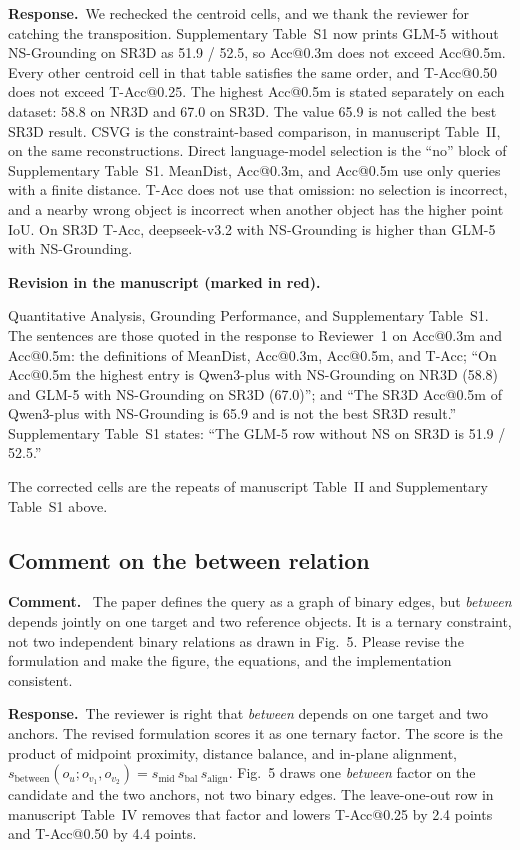 \documentclass[11pt]{article}
\newcommand{\revcomment}[1]{%
  \par\vspace{0.6em}\noindent\textcolor{revblue}{\textbf{Comment.}}\ %
  \textcolor{revblue}{#1}\par\vspace{0.4em}}
\newcommand{\revresponse}[1]{%
  \par\noindent\textbf{Response.}\ #1\par\vspace{0.3em}}
\newcommand{\revchange}[1]{%
  \par\noindent\textbf{Revision in the manuscript (marked in red).}\par
  \noindent\textcolor{revred}{#1}\par\vspace{0.8em}}
\begin{document}
\revresponse{We rechecked the centroid cells, and we thank the reviewer for catching the transposition. Supplementary Table~S1 now prints GLM-5 without NS-Grounding on SR3D as 51.9 / 52.5, so Acc@0.3m does not exceed Acc@0.5m. Every other centroid cell in that table satisfies the same order, and T-Acc@0.50 does not exceed T-Acc@0.25. The highest Acc@0.5m is stated separately on each dataset: 58.8 on NR3D and 67.0 on SR3D. The value 65.9 is not called the best SR3D result. CSVG is the constraint-based comparison, in manuscript Table~II, on the same reconstructions. Direct language-model selection is the ``no'' block of Supplementary Table~S1. MeanDist, Acc@0.3m, and Acc@0.5m use only queries with a finite distance. T-Acc does not use that omission: no selection is incorrect, and a nearby wrong object is incorrect when another object has the higher point IoU. On SR3D T-Acc, deepseek-v3.2 with NS-Grounding is higher than GLM-5 with NS-Grounding.}

\revchange{Quantitative Analysis, Grounding Performance, and Supplementary Table~S1. The sentences are those quoted in the response to Reviewer~1 on Acc@0.3m and Acc@0.5m: the definitions of MeanDist, Acc@0.3m, Acc@0.5m, and T-Acc; ``On Acc@0.5m the highest entry is Qwen3-plus with NS-Grounding on NR3D (58.8) and GLM-5 with NS-Grounding on SR3D (67.0)''; and ``The SR3D Acc@0.5m of Qwen3-plus with NS-Grounding is 65.9 and is not the best SR3D result.'' Supplementary Table~S1 states: ``The GLM-5 row without NS on SR3D is 51.9 / 52.5.''}

\noindent The corrected cells are the repeats of manuscript Table~II and Supplementary Table~S1 above.

\subsection*{Comment on the between relation}

\revcomment{The paper defines the query as a graph of binary edges, but \emph{between} depends jointly on one target and two reference objects. It is a ternary constraint, not two independent binary relations as drawn in Fig.~5. Please revise the formulation and make the figure, the equations, and the implementation consistent.}

\revresponse{The reviewer is right that \emph{between} depends on one target and two anchors. The revised formulation scores it as one ternary factor. The score is the product of midpoint proximity, distance balance, and in-plane alignment, \(s_{\mathrm{between}}(o_u;o_{v_1},o_{v_2})=s_{\mathrm{mid}}\,s_{\mathrm{bal}}\,s_{\mathrm{align}}\). Fig.~5 draws one \emph{between} factor on the candidate and the two anchors, not two binary edges. The leave-one-out row in manuscript Table~IV removes that factor and lowers T-Acc@0.25 by 2.4 points and T-Acc@0.50 by 4.4 points.}
\end{document}
